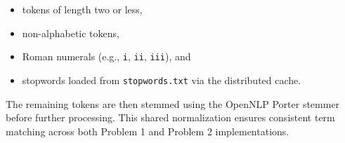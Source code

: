\documentclass[12pt,a4paper]{article}
\begin{document}
\begin{itemize}
    \item tokens of length two or less,
    \item non-alphabetic tokens,
    \item Roman numerals (e.g., \texttt{i}, \texttt{ii}, \texttt{iii}), and
    \item stopwords loaded from \texttt{stopwords.txt} via the distributed cache.
\end{itemize}

The remaining tokens are then stemmed using the OpenNLP Porter stemmer before further processing. This shared normalization ensures consistent term matching across both Problem 1 and Problem 2 implementations.
\end{document}
